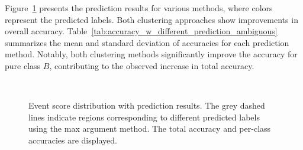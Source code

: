 \documentclass[12pt]{article}
\begin{document}
        Figure~\ref{fig:event_score_distribution_w_prediction_ambiguous} presents the prediction results for various methods, where colors represent the predicted labels. Both clustering approaches show improvements in overall accuracy. Table~\ref{tab:accuracy_w_different_prediction_ambiguous} summarizes the mean and standard deviation of accuracies for each prediction method. Notably, both clustering methods significantly improve the accuracy for pure class $B$, contributing to the observed increase in total accuracy.
       \begin{figure}[htpb]
            \centering
             \\
            \caption{Event score distribution with prediction results. The grey dashed lines indicate regions corresponding to different predicted labels using the max argument method. The total accuracy and per-class accuracies are displayed.}
            \label{fig:event_score_distribution_w_prediction_ambiguous}
        \end{figure}
\end{document}
